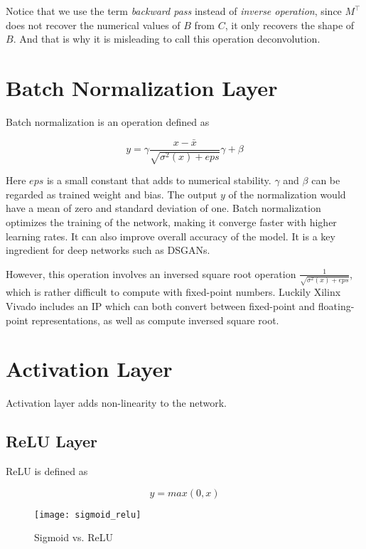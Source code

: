 Notice that we use the term \textit{backward pass} instead of \textit{inverse operation}, since $M^\intercal$
does not recover the numerical values of $B$ from $C$, it only recovers the shape of $B$. And that is why it
is misleading to call this operation deconvolution.

\section{Batch Normalization Layer}

Batch normalization is an operation defined as

\begin{equation} \label{eq:batch_normalization}
  y = \gamma \frac{x - \bar{x}}{\sqrt{\sigma^2(x) + {eps}}} \gamma + \beta
\end{equation}

Here $eps$ is a small constant that adds to numerical stability. $\gamma$ and $\beta$ can be regarded
as trained weight and bias. The output $y$ of the normalization would have a mean of zero and standard
deviation of one. Batch normalization optimizes the training of the network, making it converge
faster with higher learning rates. It can also improve overall accuracy of the model. It is a key ingredient
for deep networks such as DSGANs.

However, this operation involves an inversed square root operation $\frac{1}{\sqrt{\sigma^2(x) + eps}}$,
which is rather difficult to compute with fixed-point numbers. Luckily Xilinx Vivado includes an IP which
can both convert between fixed-point and floating-point representations, as well as compute inversed square
root.

\section{Activation Layer}

Activation layer adds non-linearity to the network.

\subsection{ReLU Layer}

ReLU is defined as

\begin{equation} \label{eq:relu}
  y = max(0, x)
\end{equation}

\begin{figure}[h]
  \centering
  \texttt{[image: sigmoid\_relu]}
  \caption{Sigmoid vs. ReLU}
  \label{fig:sigmoid_relu}
\end{figure}

